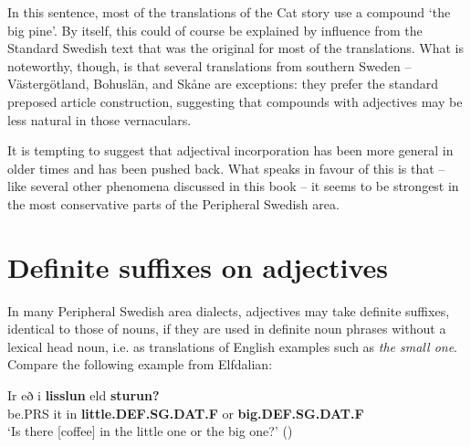 {%
In this sentence, most of the translations of the Cat story use a compound  ‘the big pine’. By itself, this could of course be explained by influence from the Standard Swedish text that was the original for most of the translations. What is noteworthy, though, is that several translations from southern Sweden – Västergötland, Bohuslän, and Skåne are exceptions: they prefer the standard preposed article construction, suggesting that compounds with adjectives may be less natural in those vernaculars.


It is tempting to suggest that adjectival incorporation has been more general in older times and has been pushed back. What speaks in favour of this is that – like several other phenomena discussed in this book – it seems to be strongest in the most conservative parts of the Peripheral Swedish area. 


\section{Definite suffixes on adjectives}
\label{bkm:Ref155519944}
In many Peripheral Swedish area dialects, adjectives may take definite suffixes, identical to those of nouns, if they are used in definite noun phrases without a lexical head noun, i.e. as translations of English examples such as \textit{the small one}. Compare the following example from Elfdalian:


\ea\label{}
\gll Ir  eð  i  \textbf{lisslun} eld  \textbf{sturun?}\\
be.PRS  it  in  \textbf{little.DEF.SG.DAT.F} or  \textbf{big.DEF.SG.DAT.F}\\
\glt ‘Is there [coffee] in the little one or the big one?’ (\citet[53]{Levander1909})
\z

}
